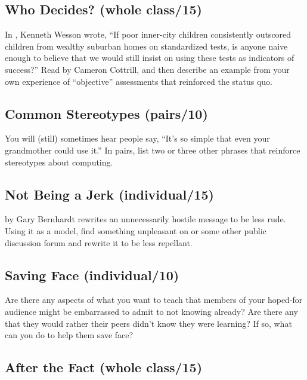\subsection*{Who Decides? (whole class/15)}

In \cite{Litt2004}, Kenneth Wesson wrote, ``If poor inner-city
children consistently outscored children from wealthy suburban homes
on standardized tests, is anyone naive enough to believe that we would
still insist on using these tests as indicators of success?'' Read
 by Cameron Cottrill, and then
describe an example from your own experience of ``objective''
assessments that reinforced the status quo.

\subsection*{Common Stereotypes (pairs/10)}

You will (still) sometimes hear people say, ``It's so simple that even
your grandmother could use it.'' In pairs, list two or three other
phrases that reinforce stereotypes about computing.

\subsection*{Not Being a Jerk (individual/15)}

 by Gary Bernhardt rewrites an
unnecessarily hostile message to be less rude. Using it as a model,
find something unpleasant on  or some
other public discussion forum and rewrite it to be less repellant.

\subsection*{Saving Face (individual/10)}

Are there any aspects of what you want to teach that members of your
hoped-for audience might be embarrassed to admit to not knowing already?
Are there any that they would rather their peers didn't know they were
learning? If so, what can you do to help them save face?

\subsection*{After the Fact (whole class/15)}

